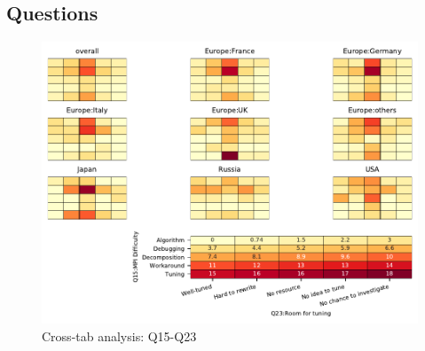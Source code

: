 
\subsection{Questions}


\begin{figure}
\begin{center}
\includegraphics[width=12cm]{../pdfs/Q15-Q23.pdf}
\caption{Cross-tab analysis: Q15-Q23}
\label{fig:Q15-Q23}
\end{center}
\end{figure}
